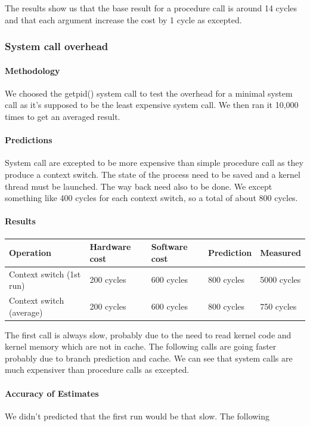 The results show us that the base result for a procedure call is around 14
cycles and that each argument increase the cost by 1 cycle as excepted.

\subsubsection{System call overhead}
\paragraph{Methodology}
We choosed the getpid() system call to test the overhead for a minimal system
call as it's supposed to be the least expensive system call.
We then ran it 10,000 times to get an averaged result.

\paragraph{Predictions}
System call are excepted to be more expensive than simple procedure call as they
produce a context switch.
The state of the process need to be saved and a kernel thread must be launched.
The way back need also to be done.
We except something like 400 cycles for each context switch, so a total of about 800 cycles.

\paragraph{Results}

\begin{tabular}{| l | l | l | l | l |}
\hline
Operation & Hardware cost & Software cost & Prediction & Measured \\
\hline
Context switch (1st run) & 200 cycles & 600 cycles & 800 cycles & 5000 cycles\\
\hline
Context switch (average) & 200 cycles & 600 cycles & 800 cycles & 750 cycles\\
\hline
\end{tabular}

The first call is always slow, probably due to the need to read kernel code and
kernel memory which are not in cache.
The following calls are going faster probably due to branch prediction and
cache.
We can see that system calls are much expensiver than procedure calls as
excepted.

\paragraph{Accuracy of Estimates}
We didn't predicted that the first run would be that slow.
The following

